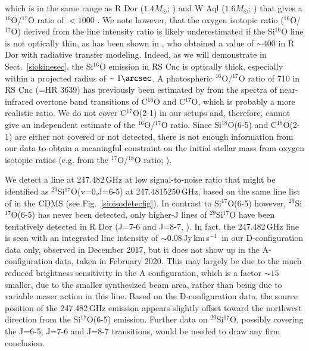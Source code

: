 \documentclass{aa}
\newcommand{\kms}{\,km\,s$^{-1}$~}
\begin{document}
which is in the same range as R Dor ($1.4M_{\odot}$; \citet{do2018})
and W Aql ($1.6 M_{\odot}$; \citet{denutteetal2017}) that gives a
$^{16}$O/$^{17}$O ratio of $<1000$ \citep{hls2016}. We note however,
that the oxygen isotopic ratio ($^{16}$O/$^{17}$O) derived from the
line intensity ratio is likely underestimated if the Si$^{16}$O line
is not optically thin, as has been shown in \citet{do2018}, who
obtained a value of $\sim400$ in R Dor with radiative transfer
modeling.  Indeed, as we will demonstrate in Sect.~\ref{siokinesec},
the Si$^{16}$O emission in RS Cnc is optically thick, especially
within a projected radius of $\sim1\arcsec$. A photospheric
$^{16}$O/$^{17}$O ratio of 710 in RS Cnc (=HR 3639) has previously
been estimated by \citet{1990ApJS...72..387S} from the spectra of
near-infrared overtone band transitions of C$^{16}$O and C$^{17}$O,
which is probably a more realistic ratio.  We do not cover
C$^{17}$O(2-1) in our setups and, therefore, cannot give an
independent estimate of the $^{16}$O/$^{17}$O ratio. Since
Si$^{18}$O(6-5) and C$^{18}$O(2-1) are either not covered or not
detected, there is not enough information from our data to obtain a
meaningful constraint on the initial stellar mass from oxygen isotopic
ratios (e.g. from the $^{17}$O/$^{18}$O ratio;
\citet{denutteetal2017}).

We detect a line at 247.482\,GHz at low signal-to-noise ratio that
might be identified as $^{29}$Si$^{17}$O(v=0,J=6-5) at
247.4815250\,GHz, based on the same line list of \citet{siocdms2013}
in the CDMS (see Fig.~\ref{sioisodetecfig}). In contrast to
Si$^{17}$O(6-5) however, $^{29}$Si$^{17}$O(6-5) has never been
detected, only higher-J lines of $^{29}$Si$^{17}$O have been
tentatively detected in R Dor (J=7-6 and J=8-7, \cite{do2018}). In
fact, the 247.482\,GHz line is seen with an integrated line intensity
of $\sim 0.08$\,Jy\kms in our D-configuration data only, observed in
December 2017, but it does not show up in the A-configuration data,
taken in February 2020.  This may largely be due to the much reduced
brightness sensitivity in the A configuration, which is a factor $\sim
15$ smaller, due to the smaller synthesized beam area, rather than
being due to variable maser action in this line. Based on the
D-configuration data, the source position of the 247.482\,GHz emission
appears slightly offset toward the northwest direction from the
Si$^{17}$O(6-5) emission. Further data on $^{29}$Si$^{17}$O, possibly
covering the J=6-5, J=7-6 and J=8-7 transitions, would be needed to
draw any firm conclusion.
\end{document}
